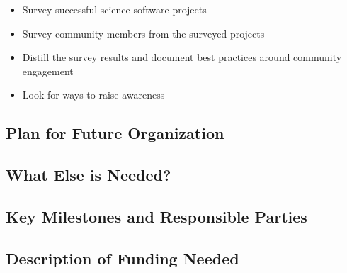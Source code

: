 \begin{itemize}
\item Survey successful science software projects
\item Survey community members from the surveyed projects
\item Distill the survey results and document best practices around community engagement
\item Look for ways to raise awareness
\end{itemize}

\subsection{Plan for Future Organization}


\subsection{What Else is Needed?}


\subsection{Key Milestones and Responsible Parties}


\subsection{Description of Funding Needed}
